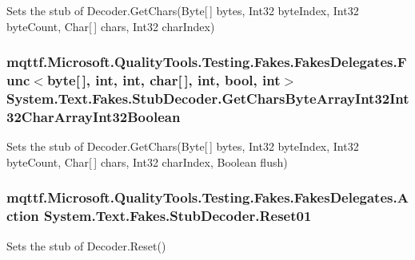Sets the stub of Decoder.\-Get\-Chars(\-Byte\mbox{[}$\,$\mbox{]} bytes, Int32 byte\-Index, Int32 byte\-Count, Char\mbox{[}$\,$\mbox{]} chars, Int32 char\-Index)

\hypertarget{class_system_1_1_text_1_1_fakes_1_1_stub_decoder_a08eacdff8bb666653e9d32206470e759}{
\subsubsection[{Get\-Chars\-Byte\-Array\-Int32\-Int32\-Char\-Array\-Int32\-Boolean}]{\setlength{\rightskip}{0pt plus 5cm}mqttf.\-Microsoft.\-Quality\-Tools.\-Testing.\-Fakes.\-Fakes\-Delegates.\-Func$<$byte\mbox{[}$\,$\mbox{]}, int, int, char\mbox{[}$\,$\mbox{]}, int, bool, int$>$ System.\-Text.\-Fakes.\-Stub\-Decoder.\-Get\-Chars\-Byte\-Array\-Int32\-Int32\-Char\-Array\-Int32\-Boolean}}\label{class_system_1_1_text_1_1_fakes_1_1_stub_decoder_a08eacdff8bb666653e9d32206470e759}


Sets the stub of Decoder.\-Get\-Chars(\-Byte\mbox{[}$\,$\mbox{]} bytes, Int32 byte\-Index, Int32 byte\-Count, Char\mbox{[}$\,$\mbox{]} chars, Int32 char\-Index, Boolean flush)

\hypertarget{class_system_1_1_text_1_1_fakes_1_1_stub_decoder_ac3482ae19a17d145e901cef9f3dba7e9}{
\subsubsection[{Reset01}]{\setlength{\rightskip}{0pt plus 5cm}mqttf.\-Microsoft.\-Quality\-Tools.\-Testing.\-Fakes.\-Fakes\-Delegates.\-Action System.\-Text.\-Fakes.\-Stub\-Decoder.\-Reset01}}\label{class_system_1_1_text_1_1_fakes_1_1_stub_decoder_ac3482ae19a17d145e901cef9f3dba7e9}


Sets the stub of Decoder.\-Reset()



